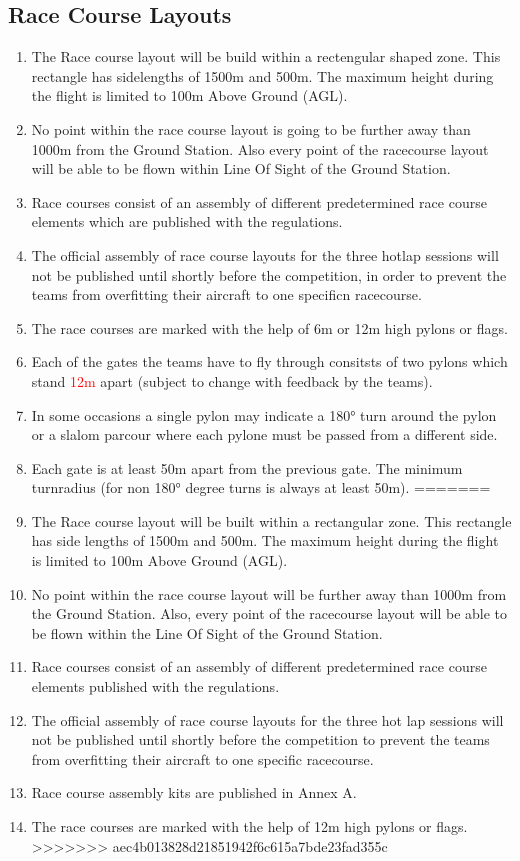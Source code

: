     \subsection{Race Course Layouts}
    \begin{enumerate}
<<<<<<< HEAD
      \item The Race course layout will be build within a rectengular shaped zone. This rectangle has sidelengths of 1500m and 500m. The maximum height during the flight is limited to 100m Above Ground (AGL).
      \item No point within the race course layout is going to be further away than 1000m from the Ground Station. Also every point of the racecourse layout will be able to be flown within Line Of Sight of the Ground Station. 
      \item Race courses consist of an assembly of different predetermined race course elements which are published with the regulations.
      \item The official assembly of race course layouts for the three hotlap sessions will not be published until shortly before the competition, in order to prevent the teams from overfitting their aircraft to one specificn racecourse. 
      \item The race courses are marked with the help of 6m or 12m high pylons or flags.
      \item Each of the gates the teams have to fly through consitsts of two pylons which stand \textcolor{red}{12m} apart (subject to change with feedback by the teams).
      \item In some occasions a single pylon may indicate a 180° turn around the pylon or a slalom parcour where each pylone must be passed from a different side. 
      \item Each gate is at least 50m apart from the previous gate. The minimum turnradius (for non 180° degree turns is always at least 50m).
=======
      \item The Race course layout will be built within a rectangular zone. This rectangle has side lengths of 1500m and 500m. The maximum height during the flight is limited to 100m Above Ground (AGL).
      \item No point within the race course layout will be further away than 1000m from the Ground Station. Also, every point of the racecourse layout will be able to be flown within the Line Of Sight of the Ground Station. 
      \item Race courses consist of an assembly of different predetermined race course elements published with the regulations.
      \item The official assembly of race course layouts for the three hot lap sessions will not be published until shortly before the competition to prevent the teams from overfitting their aircraft to one specific racecourse. 
      \item Race course assembly kits are published in Annex A. 
      \item The race courses are marked with the help of 12m high pylons or flags. 
>>>>>>> aec4b013828d21851942f6c615a7bde23fad355c
    \end{enumerate}


